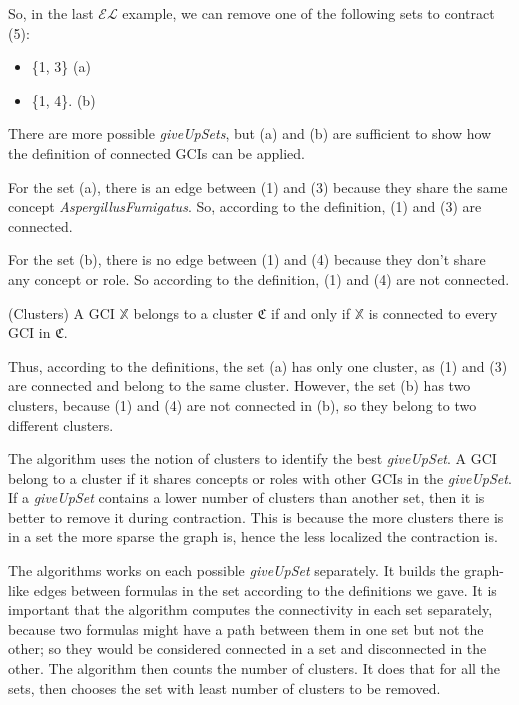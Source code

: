 So, in the last $\mathcal{EL}$ example, we can remove one of the following sets to contract (5):
\begin{itemize}
\item \{1, 3\} (a)
\item \{1, 4\}. (b)
\end{itemize}

There are more possible \textit{giveUpSets}, but (a) and (b) are sufficient to show how the definition of connected GCIs can be applied. 

For the set (a), there is an edge between (1) and (3) because they share the same concept \textit{AspergillusFumigatus}. So, according to the definition, (1) and (3) are connected.

For the set (b), there is no edge between (1) and (4) because they don't share any concept or role. So according to the definition, (1) and (4) are not connected.

\begin{defn}(Clusters)
A GCI $\mathbb{X}$ belongs to a cluster $\mathfrak{C}$ if and only if $\mathbb{X}$ is connected to every GCI in $\mathfrak{C}$.
\end{defn}

Thus, according to the definitions, the set (a) has only one cluster, as (1) and (3) are connected and belong to the same cluster. However, the set (b) has two clusters, because (1) and (4) are not connected in (b), so they belong to two different clusters.

The algorithm uses the notion of clusters to identify the best \textit{giveUpSet}. A GCI belong to a cluster if it shares concepts or roles with other GCIs in the \textit{giveUpSet}. If a \textit{giveUpSet} contains a lower number of clusters than another set, then it is better to remove it during contraction. This is because the more clusters there is in a set the more sparse the graph is, hence the less localized the contraction is. 

The algorithms works on each possible \textit{giveUpSet} separately. It builds the graph-like edges between formulas in the set according to the definitions we gave. It is important that the algorithm computes the connectivity in each set separately, because two formulas might have a path between them in one set but not the other; so they would be considered connected in a set and disconnected in the other. The algorithm then counts the number of clusters. It does that for all the sets, then chooses the set with least number of clusters to be removed.

